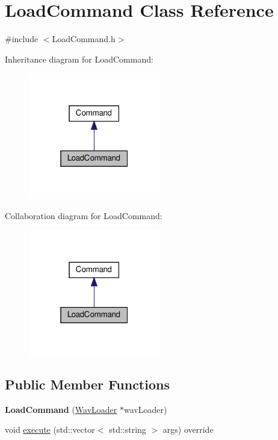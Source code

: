 \hypertarget{classLoadCommand}{}\section{Load\+Command Class Reference}
\label{classLoadCommand}


{\ttfamily \#include $<$Load\+Command.\+h$>$}



Inheritance diagram for Load\+Command\+:
\nopagebreak
\begin{figure}[H]
\begin{center}
\leavevmode
\includegraphics[width=163pt]{d5/d2d/classLoadCommand__inherit__graph}
\end{center}
\end{figure}


Collaboration diagram for Load\+Command\+:
\nopagebreak
\begin{figure}[H]
\begin{center}
\leavevmode
\includegraphics[width=163pt]{d8/dd2/classLoadCommand__coll__graph}
\end{center}
\end{figure}
\subsection*{Public Member Functions}
\begin{DoxyCompactItemize}
\item 
\mbox{\label{classLoadCommand_ac6f64508e948b4bca2b69c3843e5d24d}} 
{\bfseries Load\+Command} (\hyperlink{classWavLoader}{Wav\+Loader} $\ast$wav\+Loader)
\item 
void \hyperlink{classLoadCommand_a3e6c8b95c046e19dfd8e792876e28c50}{execute} (std\+::vector$<$ std\+::string $>$ args) override
\end{DoxyCompactItemize}


